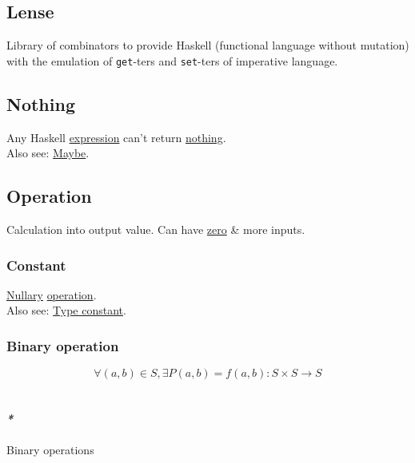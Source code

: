 \documentclass[11pt]{article}
\begin{document}
\subsection{\label{org75e5b6c}Lense}
\label{sec:org39ad6ba}
Library of combinators to provide Haskell (functional language without mutation) with the emulation of \texttt{get}-ters and \texttt{set}-ters of imperative language.\\

\subsection{\label{org235dcde}Nothing}
\label{sec:org300d6d8}
Any Haskell \hyperref[org667db83]{expression} can't return \hyperref[org235dcde]{nothing}.\\

Also see: \hyperref[orga420584]{Maybe}.\\

\subsection{\label{org87d485b}Operation}
\label{sec:org5929a9c}
Calculation into output value. Can have \hyperref[orgf8da8e8]{zero} \& more inputs.\\

\subsubsection{\label{org6cc4f99}Constant}
\label{sec:org0e29616}
\hyperref[org0fa472a]{Nullary} \hyperref[org87d485b]{operation}.\\

Also see: \hyperref[org355d800]{Type constant}.\\

\subsubsection{\label{orgd89f717}Binary operation}
\label{sec:orgcdd4563}
$$ \forall (a,b) \in S, \exists P(a,b)=f(a,b): S \times S \to S $$\\

\paragraph{\emph{*}}
\label{sec:orgccd780a}

\label{org3ca7d32}Binary operations\\
\end{document}
